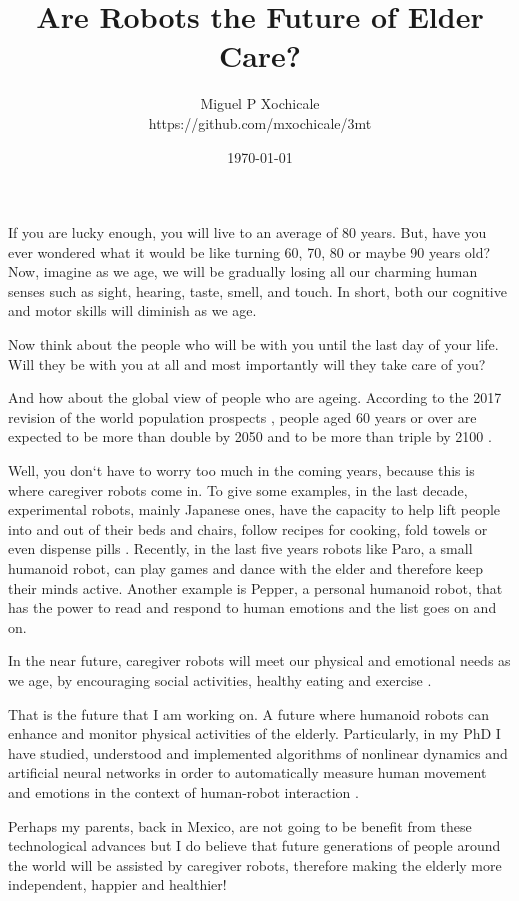 \documentclass[12pt]{article}
\title{ Are Robots the Future of Elder Care?  }
\author{Miguel P Xochicale \\
https://github.com/mxochicale/3mt}
\date{\today}
\begin{document}
\maketitle

If you are lucky enough, you will live to an average of 80 years.
But, have you ever wondered what it would be like turning 60, 70, 80 or maybe 90 years old?
Now, imagine as we age, we will be gradually losing all our
charming human senses such as sight, hearing, taste, smell, and touch.
In short, both our cognitive and motor skills will diminish as we age.

Now think about the people who will be with you until the last day of your life.
Will they be with you at all 
and most importantly will they take care of you?

And how about the global view of people who are ageing.
According to the 2017 revision of the world population prospects \cite{un2017}, 
people aged 60 years or over
are expected to be more than double by 2050 and to be more than triple by 2100 \cite{unb2017}.

Well, you don`t have to worry too much in the coming years, 
because this is where caregiver robots come in.
To give some examples, in the last decade, experimental robots, mainly Japanese ones, 
have the capacity to help lift people into and out of their beds and chairs,
follow recipes for cooking, fold towels or even dispense pills \cite{matuszek2017}.
Recently, in the last five years robots like
Paro, a small humanoid robot, can play games and dance with the elder
and therefore keep their minds active.
Another example is Pepper, a personal humanoid robot, that has the power 
to read and respond to human emotions \cite{hay2015}
and the list goes on and on.

In the near future, caregiver robots will meet our physical and emotional needs as we age, 
by encouraging social activities, healthy eating and exercise \cite{aronson2014}.

That is the future that I am working on.
A future where humanoid robots can enhance and monitor physical activities of the elderly.
Particularly, in my PhD 
I have studied, understood and implemented algorithms of nonlinear dynamics and 
artificial neural networks in order to automatically measure human movement and emotions 
in the context of human-robot interaction \cite{xochicale2018}.

Perhaps my parents, back in Mexico, are not going to be benefit 
from these technological advances 
but I do believe that future generations of people around the world 
will be assisted by caregiver robots,
therefore making the elderly more independent, happier and healthier!
\end{document}
